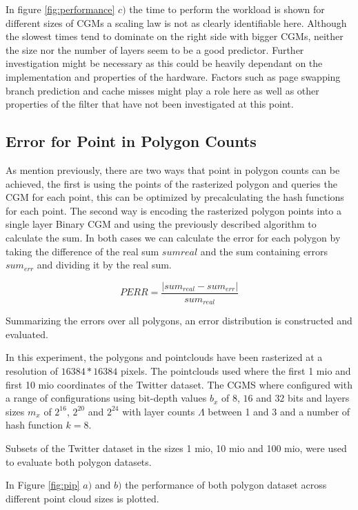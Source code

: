 \documentclass[sigconf]{acmart}
\begin{document}
In figure \ref{fig:performance} $c)$ the time to perform the workload is shown for different sizes of CGMs a scaling law is not as clearly identifiable here. Although the slowest times tend to dominate on the right side with bigger CGMs, neither the size nor the number of layers seem to be a good predictor. Further investigation might be necessary as this could be heavily dependant on the implementation and properties of the hardware. Factors such as page swapping branch prediction and cache misses might play a role here as well as other properties of the filter that have not been investigated at this point.




\subsection{Error for Point in Polygon Counts}
\label{error-for-point-in-polygon-counts}

As mention previously, there are two ways that point in polygon counts can be achieved, the first is using the points of the rasterized polygon and queries the CGM for each point, this can be optimized by precalculating the hash functions for each point. The second way is encoding the rasterized polygon points into a single layer Binary CGM and using the previously described algorithm to calculate the sum. In both cases we can calculate the error for each polygon by taking the difference of the real sum $sum{real}$ and the sum containing errors
$sum_{err}$ and dividing it by the real sum.

$$PERR = \frac{|sum_{real} - sum_{err}|}{sum_{real }}$$

Summarizing the errors over all polygons, an error distribution is constructed and evaluated.

In this experiment, the polygons and pointclouds have been rasterized at a resolution of $16384*16384$ pixels. The pointclouds used where the first 1 mio and first 10 mio coordinates of the Twitter dataset. The CGMS where configured with a range of configurations using bit-depth values $b_x$ of $8$, $16$ and $32$ bits and layers sizes $m_x$ of $2^{16}$, $2^{20}$ and $2^{24}$ with layer counts $\Lambda$ between 1 and 3 and a number of hash function $k=8$.

Subsets of the Twitter dataset in the sizes 1 mio, 10 mio and 100 mio, were used to evaluate both polygon datasets.

In Figure \ref{fig:pip} $a)$ and $b)$ the performance of both polygon dataset across different point cloud sizes is plotted.
\end{document}
